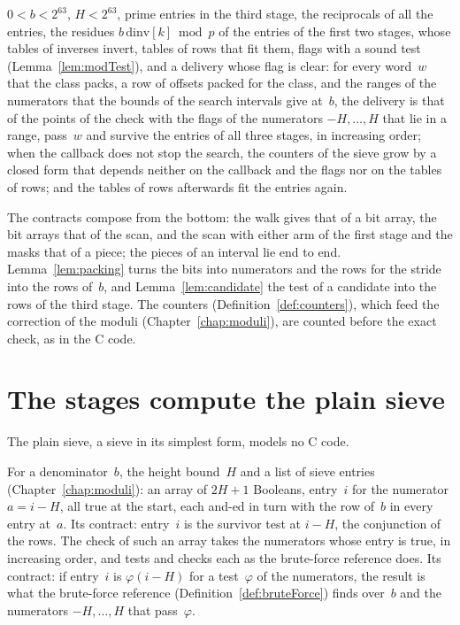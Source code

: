 \begin{definition}
  $0 < b < 2^{63}$, $H < 2^{63}$, prime entries in the third stage, the reciprocals of all the
  entries, the residues $b\,\mathrm{dinv}[k] \bmod p$ of the entries of the first two stages, whose
  tables of inverses invert, tables of rows that fit them, flags with a sound test
  (Lemma~\ref{lem:modTest}), and a delivery whose flag is clear: for every word~$w$ that the class
  packs, a row of offsets packed for the class, and the ranges of the numerators that the bounds of
  the search intervals give at~$b$, the delivery is that of the points of the check with the flags
  of the numerators $-H, \dots, H$ that lie in a range, pass~$w$ and survive the entries of all
  three stages, in increasing order; when the callback does not stop the search, the counters of the
  sieve grow by a closed form that depends neither on the callback and the flags nor on the tables
  of rows; and the tables of rows afterwards fit the entries again.
\end{definition}

The contracts compose from the bottom: the walk gives that of a bit array, the bit arrays that of
the scan, and the scan with either arm of the first stage and the masks that of a piece; the pieces
of an interval lie end to end. Lemma~\ref{lem:packing} turns the bits into numerators and the rows
for the stride into the rows of~$b$, and Lemma~\ref{lem:candidate} the test of a candidate into the
rows of the third stage. The counters (Definition~\ref{def:counters}), which feed the correction
of the moduli (Chapter~\ref{chap:moduli}), are counted before the exact check, as in the C code.

\section{The stages compute the plain sieve}\label{sec:siftTheorem}

The plain sieve, a sieve in its simplest form, models no C code.

\begin{definition}\label{def:plainSieve}
  \leanok
  For a denominator~$b$, the height bound~$H$ and a list of sieve entries
  (Chapter~\ref{chap:moduli}): an array of $2H + 1$ Booleans, entry~$i$ for the numerator
  $a = i - H$, all true at the start, each and-ed in turn with the row of~$b$ in every entry at~$a$.
  Its contract: entry~$i$ is the survivor test  at $i - H$, the
  conjunction of the rows. The check of such an array takes the numerators whose entry is true, in
  increasing order, and tests and checks each as the brute-force reference does. Its contract: if
  entry~$i$ is $\varphi(i - H)$ for a test~$\varphi$ of the numerators, the result is what the
  brute-force reference (Definition~\ref{def:bruteForce}) finds over~$b$ and the numerators
  $-H, \dots, H$ that pass~$\varphi$.
\end{definition}

